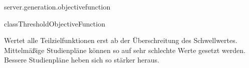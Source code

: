 \begin{texdocpackage}{server.generation.objectivefunction}
\begin{texdocclass}{class}{ThresholdObjectiveFunction}
\label{texdoclet:edu.kit.informatik.studyplan.server.generation.objectivefunction.ThresholdObjectiveFunction}
\begin{texdocclassintro}
Wertet alle Teilzielfunktionen erst ab der Überschreitung des Schwellwertes.
 Mittelmäßige Studienpläne können so auf sehr schlechte Werte gesetzt werden.
 Bessere Studienpläne heben sich so stärker heraus.\end{texdocclassintro}
\begin{texdocclassconstructors}
\end{texdocclassconstructors}
\begin{texdocclassmethods}
\end{texdocclassmethods}
\end{texdocclass}


\end{texdocpackage}



